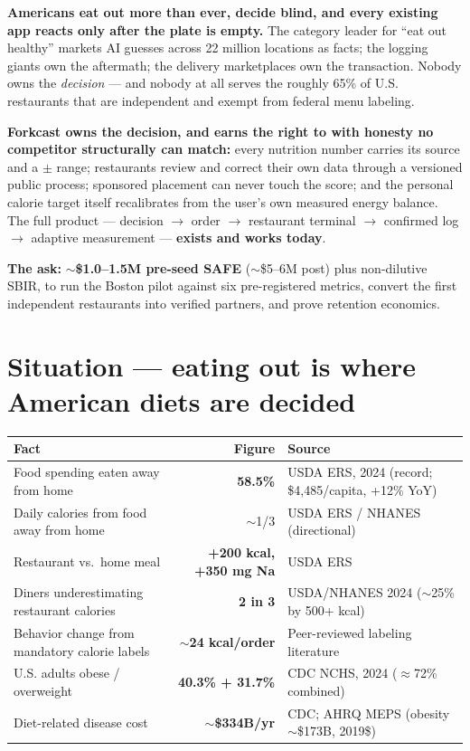 \documentclass[10pt]{article}
\begin{document}
\textbf{Americans eat out more than ever, decide blind, and every existing app reacts only after the plate is empty.} The category leader for ``eat out healthy'' markets AI guesses across 22 million locations as facts; the logging giants own the aftermath; the delivery marketplaces own the transaction. Nobody owns the \emph{decision} --- and nobody at all serves the roughly 65\% of U.S. restaurants that are independent and exempt from federal menu labeling.

\textbf{Forkcast owns the decision, and earns the right to with honesty no competitor structurally can match:} every nutrition number carries its source and a $\pm$ range; restaurants review and correct their own data through a versioned public process; sponsored placement can never touch the score; and the personal calorie target itself recalibrates from the user's own measured energy balance. The full product --- decision $\to$ order $\to$ restaurant terminal $\to$ confirmed log $\to$ adaptive measurement --- \textbf{exists and works today}.

\textbf{The ask:} $\sim$\textbf{\$1.0--1.5M pre-seed SAFE} ($\sim$\$5--6M post) plus non-dilutive SBIR, to run the Boston pilot against six pre-registered metrics, convert the first independent restaurants into verified partners, and prove retention economics.

\section{Situation --- eating out is where American diets are decided}

\begin{tabularx}{\textwidth}{@{}L r >{\raggedright\arraybackslash}p{4.6cm}@{}}
\toprule
\textbf{Fact} & \textbf{Figure} & \textbf{Source}\\
\midrule
Food spending eaten away from home & \textbf{58.5\%} & USDA ERS, 2024 (record; \$4,485/capita, +12\% YoY)\\
Daily calories from food away from home & $\sim$1/3 & USDA ERS / NHANES (directional)\\
Restaurant vs.\ home meal & \textbf{+200 kcal, +350 mg Na} & USDA ERS\\
Diners underestimating restaurant calories & \textbf{2 in 3} & USDA/NHANES 2024 ($\sim$25\% by 500+ kcal)\\
Behavior change from mandatory calorie labels & \textbf{$\sim$24 kcal/order} & Peer-reviewed labeling literature\\
U.S. adults obese / overweight & \textbf{40.3\% + 31.7\%} & CDC NCHS, 2024 ($\approx$72\% combined)\\
Diet-related disease cost & \textbf{$\sim$\$334B/yr} & CDC; AHRQ MEPS (obesity $\sim$\$173B, 2019\$)\\
\bottomrule
\end{tabularx}
\end{document}
